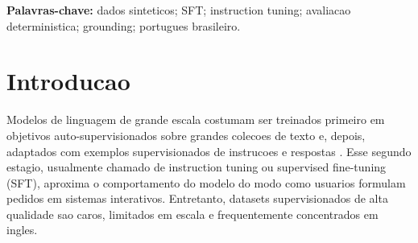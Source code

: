 \documentclass{article}
\begin{document}

\printAffiliationsAndNotice{}

\begin{abstract}
Dados supervisionados de instrucao e resposta sao um recurso central para
ajustar modelos de linguagem ao uso interativo, mas sua construcao manual e
cara e dificil de escalar. Este artigo descreve uma pipeline reprodutivel para
gerar dados sinteticos de supervised fine-tuning (SFT) em portugues brasileiro
a partir de artigos da Wikipedia. O metodo combina selecao e chunking
deterministicos do corpus, planejamento balanceado de tipos de tarefa e
dificuldade, geracao batelada com um unico modelo instrucional local e uma
etapa de filtragem inteiramente deterministica. Diferentemente de pipelines que
dependem de um segundo modelo julgador, a avaliacao principal aceita apenas
candidatos que satisfazem regras verificaveis de formato, auto-contencao,
nao duplicacao e ancoragem em spans de evidencia extraidos do documento de
origem. Em uma execucao sobre o corpus \texttt{costadev00/wiki-brazil}, o
sistema planejou 22.596 exemplos a partir de 1.614 documentos elegiveis,
gerou 35.876 tentativas e exportou 20.378 exemplos aceitos em tres formatos
de SFT. A analise do ledger SQLite da execucao mostra taxa de aceitacao de
56,8\%, com rejeicoes dominadas por problemas de evidencia, duplicatas
normalizadas e referencias ao contexto oculto.
\end{abstract}

\noindent
\textbf{Palavras-chave:} dados sinteticos; SFT; instruction tuning; avaliacao
deterministica; grounding; portugues brasileiro.

\section{Introducao}

Modelos de linguagem de grande escala costumam ser treinados primeiro em
objetivos auto-supervisionados sobre grandes colecoes de texto e, depois,
adaptados com exemplos supervisionados de instrucoes e respostas
\citep{ouyang2022training,wei2022finetuned}. Esse segundo estagio, usualmente
chamado de instruction tuning ou supervised fine-tuning (SFT), aproxima o
comportamento do modelo do modo como usuarios formulam pedidos em sistemas
interativos. Entretanto, datasets supervisionados de alta qualidade sao caros,
limitados em escala e frequentemente concentrados em ingles.
\end{document}
